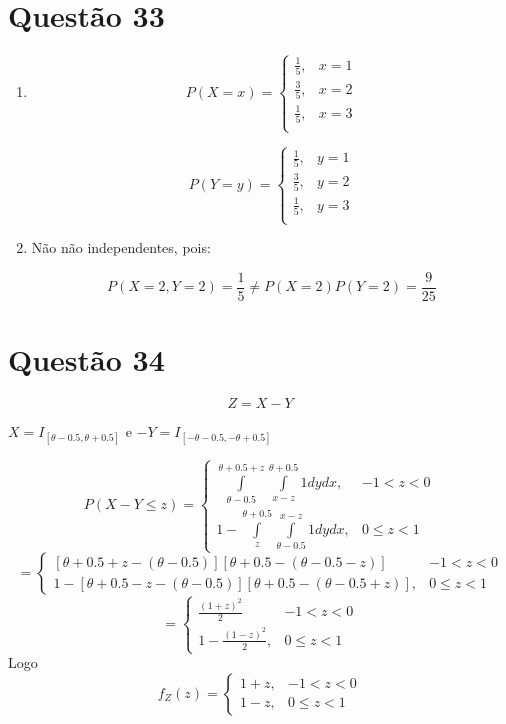 \documentclass[a4paper,12pt]{report}
\begin{document}
				\section{Questão 33}
									\begin{enumerate}[label=\alph*)]
										\item															
				$$ 
			P(X=x)=\begin{cases}
					\frac{1}{5}, & x=1 \\
					\frac{3}{5}, & x=2 \\
					\frac{1}{5}, & x=3\\
																																												
\end{cases}
						$$
						
										$$ 
						P(Y=y)=\begin{cases}
						\frac{1}{5}, & y=1 \\
						\frac{3}{5}, & y=2 \\
						\frac{1}{5}, & y=3\\
						\end{cases}
						$$
						\item
						Não não independentes, pois:
						
						$$P(X=2,Y=2)=\frac{1}{5} \ne P(X=2)P(Y=2)= \frac{9}{25} $$
						
						
							\end{enumerate}
						
						\newpage 
						
							\section{Questão 34}
							
							$$Z=X-Y $$
							
							$X=I_{[\theta - 0.5,\theta+0.5]}$ e $-Y= I_{[-\theta - 0.5,-\theta+0.5]}$
							
							 $$P(X-Y\le z) = \begin{cases}
							 \int\limits_{\theta - 0.5}^{\theta+0.5+z} \int\limits_{x-z}^{\theta+0.5}1dydx, & -1 < z < 0\\
							 1 - \int\limits_{z}^{\theta+0.5}\int\limits_{\theta-0.5}^{x-z}1dydx, & 0\le z< 1
							 \end{cases} 
							 $$
							 $$
							 =
							 \begin{cases}
							 [\theta + 0.5+z-(\theta-0.5)][\theta+0.5-(\theta-0.5-z)] & -1 < z < 0\\
							 	 1 -[\theta+0.5-z-(\theta-0.5)][\theta+0.5-(\theta-0.5+z)], & 0\le z< 1
							 \end{cases}
							 $$
							 	 $$
							 =
							 \begin{cases}
							 \frac{(1+z)^2}{2} & -1 < z < 0\\
						1-\frac{(1-z)^2}{2}, & 0\le z< 1
							 \end{cases}
							 $$
Logo
$$ 
f_Z(z)=\begin{cases}
						1+z,& -1 < z < 0\\
1-z, & 0\le z< 1
\end{cases}
$$
\end{document}
